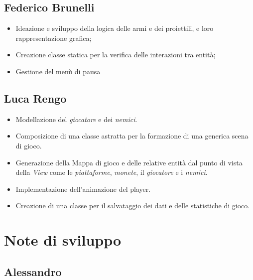 \subsection*{Federico Brunelli}

\begin{itemize}
    \item  Ideazione e sviluppo della logica delle armi e dei proiettili, e loro rappresentazione grafica;
    \item Creazione classe statica per la verifica delle interazioni tra entità;
    \item Gestione del menù di pausa
\end{itemize}

\subsection*{Luca Rengo}

\begin{itemize}
	\item  \textsf{\small Modellazione del \emph{giocatore} e dei \emph{nemici}.}
	\item \textsf{\small Composizione di una classe astratta per la formazione di una generica scena di gioco.}
	\item \textsf{\small Generazione della Mappa di gioco e delle relative entità dal punto di vista della \emph{View} come le \emph{piattaforme}, \emph{monete}, il \emph{giocatore} e i \emph{nemici}.}
	\item \textsf{\small Implementazione dell'animazione del player.}
	\item \textsf{\small Creazione di una classe per il salvataggio dei dati e delle statistiche di gioco.}
\end{itemize}

\section{Note di sviluppo}

\subsection*{Alessandro}

